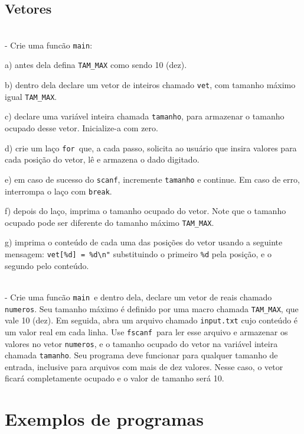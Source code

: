 \documentclass{book}
\newcommand{\NEWLINE}{~\\}
\newcommand{\FOR}{{\tt for}}
\newcommand{\BREAK}{{\tt break}}
\newcommand{\MAIN}{{\tt main}}
\newcommand{\SCANF}{{\tt scanf}}
\newcommand{\FSCANF}{{\tt fscanf}}
\begin{document}

\zeraquest

\section{Vetores}


\NEWLINE
\quest - Crie uma funcão \MAIN:

a) antes dela defina \verb|TAM_MAX| como sendo 10 (dez).

b) dentro dela declare um vetor de inteiros chamado {\tt vet}, com tamanho máximo igual \verb|TAM_MAX|.

c) declare uma variável inteira chamada {\tt tamanho}, para armazenar o tamanho ocupado desse vetor. Inicialize-a com zero.

d) crie um laço \FOR\ que, a cada passo, solicita ao usuário que insira valores para cada posição do vetor, lê e armazena o dado digitado.

e) em caso de sucesso do \SCANF, incremente {\tt tamanho} e continue. Em caso de erro, interrompa o laço com \BREAK.

f) depois do laço, imprima o tamanho ocupado do vetor. Note que o tamanho ocupado pode ser diferente do tamanho máximo \verb|TAM_MAX|.

g) imprima o conteúdo de cada uma das posições do vetor usando a seguinte mensagem: \verb|vet[%d] = %d\n"| substituindo o primeiro \verb|%d| pela posição, e o segundo pelo conteúdo.

\NEWLINE
\quest - Crie uma funcão \MAIN\ e dentro dela, declare um vetor de reais chamado {\tt numeros}. Seu tamanho máximo é definido por uma macro chamada \verb|TAM_MAX|, que vale 10 (dez). Em seguida, abra um arquivo chamado {\tt input.txt} cujo conteúdo é um valor real em cada linha. Use \FSCANF\ para ler esse arquivo e armazenar os valores no vetor {\tt numeros}, e o tamanho ocupado do vetor na variável inteira chamada {\tt tamanho}. Seu programa deve funcionar para qualquer tamanho de entrada, inclusive para arquivos com mais de dez valores. Nesse caso, o vetor ficará completamente ocupado e o valor de tamanho será 10.




\chapter{Exemplos de programas}
\end{document}
